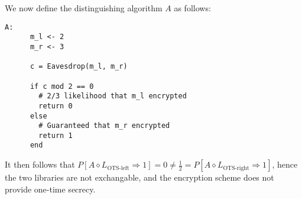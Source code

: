 \documentclass[a4paper]{scrreprt}
\begin{document}
We now define the distinguishing algorithm $A$ as follows:

\begin{lstlisting}[mathescape=true]
	A:
	  m_l <- 2
	  m_r <- 3

	  c = Eavesdrop(m_l, m_r)

	  if c mod 2 == 0
	    # 2/3 likelihood that m_l encrypted
	    return 0
	  else
	    # Guaranteed that m_r encrypted
	    return 1
	  end
\end{lstlisting}

It then follows that $P[A \diamond L_{\text{OTS-left}} \Rightarrow 1] = 0 \neq
\frac{1}{2} = P[A \diamond L_{\text{OTS-right}} \Rightarrow 1]$, hence the two
libraries are not exchangable, and the encryption scheme does not provide
one-time secrecy.
\end{document}
